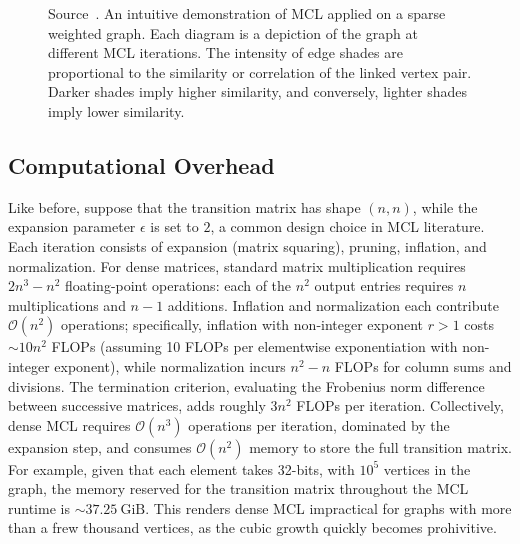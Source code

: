 \begin{figure}[htbp]
  \vspace{0.3cm}

  \caption{Source~\cite{mcl}. An intuitive demonstration of MCL applied on a sparse weighted graph. Each diagram is a depiction of the graph at different MCL iterations. The intensity of edge shades are proportional to the similarity or correlation of the linked vertex pair. Darker shades imply higher similarity, and conversely, lighter shades imply lower similarity.}
  \label{fig:mcl_iter}

\end{figure}

\subsection{Computational Overhead}

Like before, suppose that the transition matrix has shape \((n, n)\), while the
expansion parameter \(\epsilon\) is set to \(2\), a common design choice in MCL
literature. Each iteration consists of expansion (matrix squaring), pruning,
inflation, and normalization. For dense matrices, standard matrix
multiplication requires \(2 n^3 - n^2\) floating-point operations: each of the
\(n^2\) output entries requires \(n\) multiplications and \(n-1\) additions.
Inflation and normalization each contribute \(\mathcal{O}(n^2)\) operations;
specifically, inflation with non-integer exponent \(r>1\) costs
\(\sim 10 n^2\) FLOPs (assuming 10 FLOPs per elementwise exponentiation with
non-integer exponent), while normalization incurs \(n^2 - n\) FLOPs for column
sums and divisions. The termination criterion, evaluating the Frobenius norm
difference between successive matrices, adds roughly \(3n^2\) FLOPs per
iteration. Collectively, dense MCL requires \(\mathcal{O}(n^3)\) operations per
iteration, dominated by the expansion step, and consumes \(\mathcal{O}(n^2)\)
memory to store the full transition matrix. For example, given that each
element takes 32-bits, with \(10^5\) vertices in the graph, the memory reserved
for the transition matrix throughout the MCL runtime is \(\sim 37.25 \
\text{GiB}\). This renders dense MCL impractical for graphs with more than a frew thousand vertices, as the cubic growth quickly becomes prohivitive.

